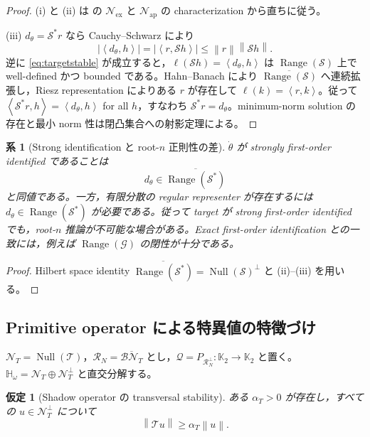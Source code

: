 \documentclass[11pt,a4paper]{ltjsarticle}
\newtheorem{assumption}{仮定}[section]
\newtheorem{corollary}{系}[section]
\theoremstyle{remark}
\newcommand{\abs}[1]{\left|#1\right|}
\newcommand{\norm}[1]{\left\lVert#1\right\rVert}
\newcommand{\inner}[2]{\left\langle#1,#2\right\rangle}
\newcommand{\cN}{\mathcal N}
\newcommand{\cR}{\mathcal R}
\newcommand{\Top}{\mathscr T}
\newcommand{\Bop}{\mathscr B}
\newcommand{\Gop}{\mathscr G}
\newcommand{\Sop}{\mathscr S}
\newcommand{\Qop}{\mathscr Q}
\newcommand{\Null}{\operatorname{Null}}
\newcommand{\Range}{\operatorname{Range}}
\begin{document}
\begin{proof}
(i) と (ii) は  の $\cN_{\mathrm{ex}}$ と $\cN_{\mathrm{ap}}$ の characterization から直ちに従う。

(iii) $d_\theta=\Sop^*r$ なら Cauchy--Schwarz により
\[
\abs{\inner{d_\theta}{h}}
=\abs{\inner r{\Sop h}}
\le\norm r\norm{\Sop h}.
\]
逆に \eqref{eq:targetstable} が成立すると，$\ell(\Sop h)=\inner{d_\theta}{h}$ は $\Range(\Sop)$ 上で well-defined かつ bounded である。Hahn--Banach により $\overline{\Range(\Sop)}$ へ連続拡張し，Riesz representation によりある $r$ が存在して $\ell(k)=\inner r k$。従って $\inner{\Sop^*r}{h}=\inner{d_\theta}{h}$ for all $h$，すなわち $\Sop^*r=d_\theta$。minimum-norm solution の存在と最小 norm 性は閉凸集合への射影定理による。
\end{proof}

\begin{corollary}[Strong identification と root-$n$ 正則性の差]\label{cor:closurevsrange}
$\dot\theta$ が strongly first-order identified であることは
\[
d_\theta\in\overline{\Range(\Sop^*)}
\]
と同値である。一方，有限分散の regular representer が存在するには $d_\theta\in\Range(\Sop^*)$ が必要である。従って target が strong first-order identified でも，root-$n$ 推論が不可能な場合がある。Exact first-order identification との一致には，例えば $\Range(\Gop)$ の閉性が十分である。
\end{corollary}

\begin{proof}
Hilbert space identity $\overline{\Range(\Sop^*)}=\Null(\Sop)^\perp$ と (ii)--(iii) を用いる。
\end{proof}

\subsection{Primitive operator による特異値の特徴づけ}
$\cN_T=\Null(\Top)$，$\cR_N=\overline{\Bop\cN_T}$ とし，$\Qop=P_{\cR_N^\perp}:\mathbb K_2\to\mathbb K_2$ と置く。$\mathbb H_\omega=\cN_T\oplus\cN_T^\perp$ と直交分解する。

\begin{assumption}[Shadow operator の transversal stability]\label{as:Tstable}
ある $\alpha_T>0$ が存在し，すべての $u\in\cN_T^\perp$ について
\begin{equation}
\norm{\Top u}\ge\alpha_T\norm u.
\label{eq:Tbelow}
\end{equation}
\end{assumption}
\end{document}
